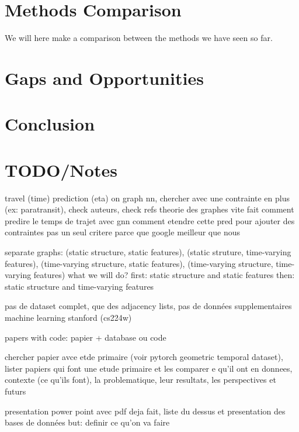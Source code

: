 \documentclass[10pt]{article}
\begin{document}
    \section{Methods Comparison}\label{sec:methods-comparison}
    We will here make a comparison between the methods we have seen so far.


    \section{Gaps and Opportunities}\label{sec:gaps-and-opportunities}


    \section{Conclusion}\label{sec:conclusion}


    \section{TODO/Notes}\label{sec:todo/notes}
    travel (time) prediction (eta) on graph nn, chercher avec une contrainte en plus (ex: paratransit), check auteurs, check refs
    theorie des graphes vite fait
    comment predire le temps de trajet avec gnn
    comment etendre cette pred pour ajouter des contraintes
    pas un seul critere parce que google meilleur que nous

    separate graphs: (static structure, static features), (static struture, time-varying features), (time-varying
    structure, static features), (time-varying structure, time-varying features)
    what we will do? first: static structure and static features
    then: static structure and time-varying features

    pas de dataset complet, que des adjacency lists, pas de données supplementaires
    machine learning stanford (cs224w)

    papers with code: papier + database ou code

    chercher papier avce etde primaire (voir pytorch geometric temporal dataset), lister papiers qui font une etude primaire et les comparer
    e qu'il ont en donnees, contexte (ce qu'ils font), la problematique, leur resultats, les perspectives et futurs

    presentation power point avec pdf deja fait, liste du dessus et presentation des bases de données
    but: definir ce qu'on va faire

    
    
\end{document}
